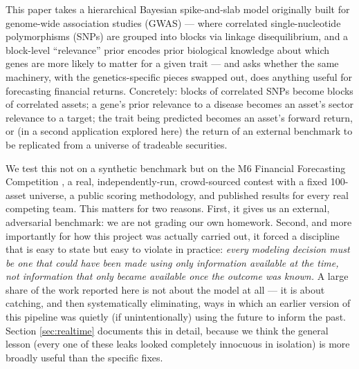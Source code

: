 \documentclass[11pt]{article}
\begin{document}
This paper takes a hierarchical Bayesian spike-and-slab model originally built
for genome-wide association studies (GWAS) \citep{johnston2015} --- where
correlated single-nucleotide polymorphisms (SNPs) are grouped into blocks via
linkage disequilibrium, and a block-level ``relevance'' prior encodes prior
biological knowledge about which genes are more likely to matter for a given
trait --- and asks whether the same machinery, with the genetics-specific
pieces swapped out, does anything useful for forecasting financial returns.
Concretely: blocks of correlated SNPs become blocks of correlated assets; a
gene's prior relevance to a disease becomes an asset's sector relevance to a
target; the trait being predicted becomes an asset's forward return, or (in a
second application explored here) the return of an external benchmark to be
replicated from a universe of tradeable securities.

We test this not on a synthetic benchmark but on the M6 Financial Forecasting
Competition \citep{makridakis2024}, a real, independently-run, crowd-sourced
contest with a fixed 100-asset universe, a public scoring methodology, and
published results for every real competing team. This matters for two reasons.
First, it gives us an external, adversarial benchmark: we are not grading our
own homework. Second, and more importantly for how this project was actually
carried out, it forced a discipline that is easy to state but easy to violate
in practice: \emph{every modeling decision must be one that could have been
made using only information available at the time, not information that only
became available once the outcome was known.} A large share of the work
reported here is not about the model at all --- it is about catching, and then
systematically eliminating, ways in which an earlier version of this pipeline
was quietly (if unintentionally) using the future to inform the past. Section
\ref{sec:realtime} documents this in detail, because we think the general
lesson (every one of these leaks looked completely innocuous in isolation) is
more broadly useful than the specific fixes.
\end{document}
